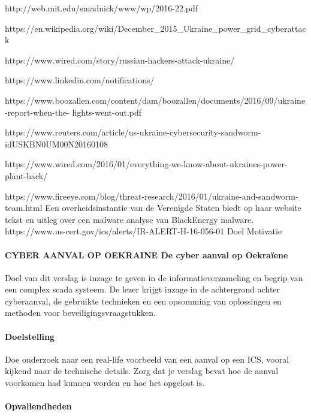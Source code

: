 http://web.mit.edu/smadnick/www/wp/2016-22.pdf

https://en.wikipedia.org/wiki/December_2015_Ukraine_power_grid_cyberattack

https://www.wired.com/story/russian-hackers-attack-ukraine/

https://www.linkedin.com/notifications/

https://www.boozallen.com/content/dam/boozallen/documents/2016/09/ukraine-report-when-the-
lights-went-out.pdf

https://www.reuters.com/article/us-ukraine-cybersecurity-sandworm-idUSKBN0UM00N20160108

https://www.wired.com/2016/01/everything-we-know-about-ukraines-power-plant-hack/

https://www.fireeye.com/blog/threat-research/2016/01/ukraine-and-sandworm-team.html
Een overheidsinstantie van de Verenigde Staten biedt op haar website tekst en uitleg over een
malware analyse van BlackEnergy malware.
https://www.us-cert.gov/ics/alerts/IR-ALERT-H-16-056-01
Doel
Motivatie


 \paragraph{CYBER AANVAL OP OEKRAINE De cyber aanval op Oekraïene}


Doel van dit verslag is inzage te geven in de informatieverzameling en begrip van een complex scada
systeem. De lezer krijgt inzage in de achtergrond achter cyberaanval, de gebruikte technieken en
een opsomming van oplossingen en methoden voor beveiligingsvraagstukken.
\paragraph{Doelstelling}

Doe onderzoek naar een real-life voorbeeld van een aanval op een ICS,
vooral kijkend naar de technische details.
Zorg dat je verslag bevat hoe de aanval voorkomen had kunnen worden en
hoe het opgelost is.



\paragraph{Opvallendheden}


